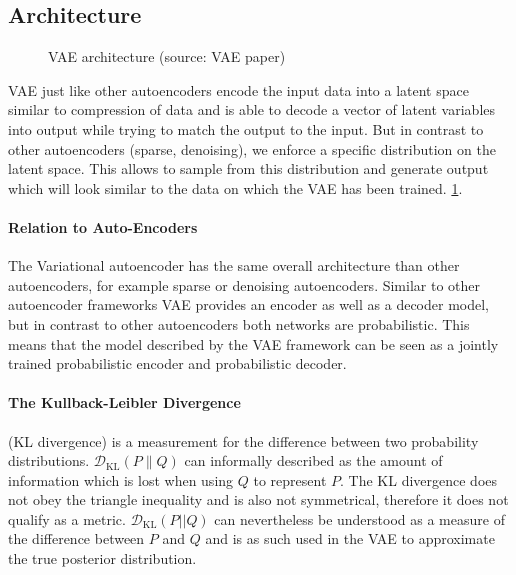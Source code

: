 
\subsection{Architecture}
\label{sub:vae_architecture}

\begin{figure}[htb]
\centering
\resizebox{5cm}{!}{}
  \caption{VAE architecture (source: VAE paper)}\label{fig:vae_architecture}
\end{figure}
VAE just like other autoencoders encode the input data into a latent space similar to compression of data and is able to decode a vector of latent variables into output while trying to match the output to the input.
But in contrast to other autoencoders (sparse, denoising), we enforce a specific distribution on the latent space.
This allows to sample from this distribution and generate output which will look similar to the data on which the VAE has been trained.
\ref{fig:vae_architecture}.

\paragraph{Relation to Auto-Encoders}
The Variational autoencoder has the same overall architecture than other autoencoders, for example sparse or denoising autoencoders.
Similar to other autoencoder frameworks VAE provides an encoder as well as a decoder model, but in contrast to other autoencoders both networks are probabilistic. This means that the model described by the VAE framework can be seen as a jointly trained probabilistic encoder and probabilistic decoder.



\paragraph{The Kullback-Leibler Divergence} (KL divergence) is a measurement for the difference between two probability distributions. $\mathcal{D}_{\mathrm{KL}}(P \| Q)$ can informally described as the amount of information which is lost when using $Q$ to represent $P$.
The KL divergence does not obey the triangle inequality and is also not symmetrical, therefore it does not qualify as a metric.
$\mathcal{D}_{\mathrm{KL}}(P||Q)$ can nevertheless be understood as a measure of the difference between $P$ and $Q$ and is as such used in the VAE to approximate the true posterior distribution.

